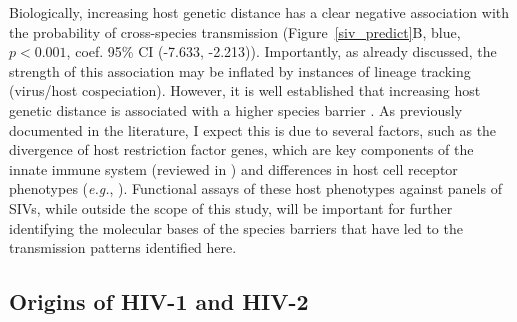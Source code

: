 Biologically, increasing host genetic distance has a clear negative association with the probability of cross-species transmission (Figure~\ref{siv_predict}B, blue, $p<0.001$, coef. 95\% CI (-7.633, -2.213)).
Importantly, as already discussed, the strength of this association may be inflated by instances of lineage tracking (virus/host cospeciation).
However, it is well established that increasing host genetic distance is associated with a higher species barrier \citep{charleston2002preferential}.
As previously documented in the literature, I expect this is due to several factors, such as the divergence of host restriction factor genes, which are key components of the innate immune system (reviewed in \citep{harris2012restriction}) and differences in host cell receptor phenotypes (\textit{e.g.}, \citep{chen1998natural,pandrea2007paucity,riddick2010novel}).
Functional assays of these host phenotypes against panels of SIVs, while outside the scope of this study, will be important for further identifying the molecular bases of the species barriers that have led to the transmission patterns identified here.

\subsection{Origins of HIV-1 and HIV-2}
